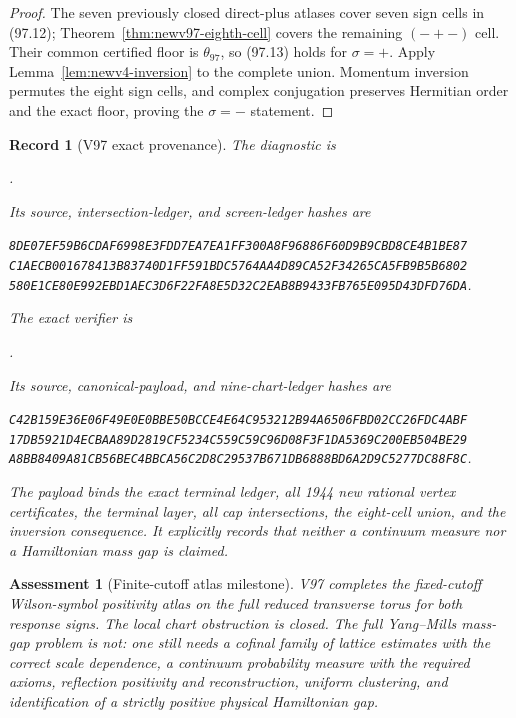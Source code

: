\documentclass[11pt,oneside]{article}
\newtheorem{assessment}[theorem]{Assessment}
\newtheorem{record}[theorem]{Record}
\theoremstyle{definition}
\theoremstyle{remark}
\begin{document}
\begin{proof}
The seven previously closed direct-plus atlases cover seven sign
cells in (97.12); Theorem~\ref{thm:newv97-eighth-cell} covers the
remaining \((-+-)\) cell.  Their common certified floor is
\(\theta_{97}\), so (97.13) holds for \(\sigma=+\).  Apply
Lemma~\ref{lem:newv4-inversion} to the complete union.  Momentum
inversion permutes the eight sign cells, and complex conjugation
preserves Hermitian order and the exact floor, proving the
\(\sigma=-\) statement.
\end{proof}

\begin{record}[V97 exact provenance]
\label{rec:newv97-provenance}
The diagnostic is
\begin{center}\footnotesize
{}.
\end{center}
Its source, intersection-ledger, and screen-ledger hashes are
\begin{center}\scriptsize
\texttt{8DE07EF59B6CDAF6998E3FDD7EA7EA1FF300A8F96886F60D9B9CBD8CE4B1BE87}\\
\texttt{C1AECB001678413B83740D1FF591BDC5764AA4D89CA52F34265CA5FB9B5B6802}\\
\texttt{580E1CE80E992EBD1AEC3D6F22FA8E5D32C2EAB8B9433FB765E095D43DFD76DA}.
\end{center}
The exact verifier is
\begin{center}\footnotesize
{}.
\end{center}
Its source, canonical-payload, and nine-chart-ledger hashes are
\begin{center}\scriptsize
\texttt{C42B159E36E06F49E0E0BBE50BCCE4E64C953212B94A6506FBD02CC26FDC4ABF}\\
\texttt{17DB5921D4ECBAA89D2819CF5234C559C59C96D08F3F1DA5369C200EB504BE29}\\
\texttt{A8BB8409A81CB56BEC4BBCA56C2D8C29537B671DB6888BD6A2D9C5277DC88F8C}.
\end{center}
The payload binds the exact terminal ledger, all 1944 new rational
vertex certificates, the terminal layer, all cap intersections, the
eight-cell union, and the inversion consequence.  It explicitly
records that neither a continuum measure nor a Hamiltonian mass gap
is claimed.
\end{record}

\begin{assessment}[Finite-cutoff atlas milestone]
\label{ass:newv97}
V97 completes the fixed-cutoff Wilson-symbol positivity atlas on the
full reduced transverse torus for both response signs.  The local
chart obstruction is closed.  The full Yang--Mills mass-gap problem
is not: one still needs a cofinal family of lattice estimates with
the correct scale dependence, a continuum probability measure with
the required axioms, reflection positivity and reconstruction,
uniform clustering, and identification of a strictly positive
physical Hamiltonian gap.
\end{assessment}
\end{document}
